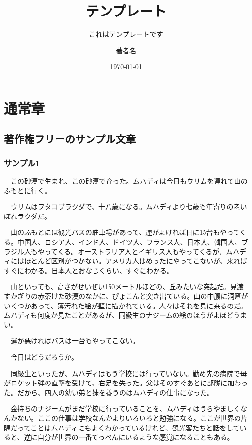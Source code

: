 \documentclass[10pt,a4paper,openright]{ltjsbook}
\title{テンプレート}
\subtitle{これはテンプレートです}
\author{著者名}
\date{\today}
\begin{document}
\maketitle

\tableofcontents

\chapter{通常章}

\section{著作権フリーのサンプル文章}

\subsection{サンプル1}

　この砂漠で生まれ、この砂漠で育った。ムハディは今日もウリムを連れて山のふもとに行く。

　ウリムはフタコブラクダで、十八歳になる。ムハディより七歳も年寄りの老いぼれラクダだ。

　山のふもとには観光バスの駐車場があって、運がよければ日に15台もやってくる。中国人、ロシア人、インド人、ドイツ人、フランス人、日本人、韓国人、ブラジル人もやってくる。オーストラリア人とイギリス人もやってくるが、ムハディにはほとんど区別がつかない。アメリカ人はめったにやってこないが、来ればすぐにわかる。日本人とおなじくらい、すぐにわかる。

　山といっても、高さがせいぜい150メートルほどの、丘みたいな突起だ。見渡すかぎりの赤茶けた砂漠のなかに、ぴょこんと突き出ている。山の中腹に洞窟がいくつかあって、薄汚れた絵が壁に描かれている。人々はそれを見に来るのだ。ムハディも何度か見たことがあるが、同級生のナジームの絵のほうがよほどうまい。

　運が悪ければバスは一台もやってこない。

　今日はどうだろうか。

　同級生といったが、ムハディはもう学校には行っていない。勤め先の病院で母がロケット弾の直撃を受けて、右足を失った。父はそのすぐあとに部隊に加わった。だから、四人の幼い弟と妹を養うのはムハディの仕事になった。

　金持ちのナジームがまだ学校に行っていることを、ムハディはうらやましくなんかない。ここの仕事は学校なんかよりいろいろと勉強になる。ここが世界の片隅だってことはムハディにもよくわかっているけれど、観光客たちと話をしていると、逆に自分が世界の一番てっぺんにいるような感覚になることもある。
\end{document}
